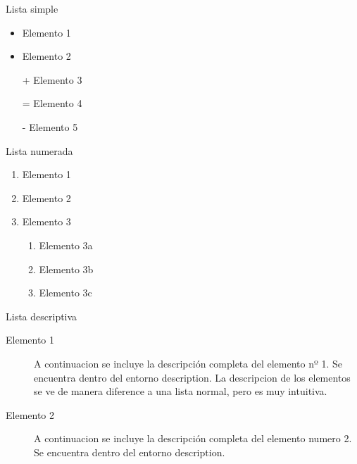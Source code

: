 \documentclass{article}
\begin{document}
Lista simple
\begin{itemize}
  \item Elemento 1
  \item Elemento 2
  \item[+] Elemento 3
  \item[=] Elemento 4
  \item[-] Elemento 5
\end{itemize}

\hfill \break

Lista numerada
\begin{enumerate}
  \item Elemento 1
  \item Elemento 2
  \item Elemento 3
  \begin{enumerate}
    \item Elemento 3a
    \item Elemento 3b
    \item Elemento 3c
  \end{enumerate}
\end{enumerate}

\hfill \break

Lista descriptiva
\begin{description}
  \item [Elemento 1] A continuacion se incluye la descripci\'on completa del elemento nº 1. Se encuentra dentro del entorno description. La descripcion de los elementos se ve de manera diference a una lista normal, pero es muy intuitiva.
  \item [Elemento 2] A continuacion se incluye la descripci\'on completa del elemento numero 2. Se encuentra dentro del entorno description.
\end{description}
\end{document}
